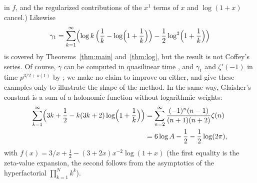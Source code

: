 \documentclass[11pt,reqno]{amsart}
\theoremstyle{definition}
\theoremstyle{remark}
\begin{document}
in $f$, and the regularized contributions of the $x^1$ terms of $x$ and $\log(1+x)$ cancel.) Likewise
\[
  \gamma_1 = \sum_{k=1}^{\infty}\Bigl(\log k\,\Bigl(\frac1k - \log\Bigl(1+\frac1k\Bigr)\Bigr)
    - \frac12\log^2\Bigl(1+\frac1k\Bigr)\Bigr)
\]
is covered by Theorems~\ref{thm:main} and~\ref{thm:log}, but the result is not Coffey's series. Of course, $\gamma$ can be computed in
quasilinear time \cite{BM80}, and $\gamma_1$ and $\zeta'(-1)$ in time $p^{3/2+o(1)}$ by \cite{Joh21}; we make no
claim to improve on either, and give these examples only to illustrate the shape of the method. In the same way,
Glaisher's constant is a sum of a holonomic
function without logarithmic weights:
\begin{align*}
  \sum_{k=1}^{\infty}\Bigl(3k + \frac12 - k(3k+2)\log\Bigl(1+\frac1k\Bigr)\Bigr)
  &= \sum_{n=2}^{\infty}\frac{(-1)^n(n-1)}{(n+1)(n+2)}\zeta(n) \\
  &= 6\log A - \frac12 - \frac12\log(2\pi),
\end{align*}
with $f(x) = 3/x + \frac12 - (3+2x)x^{-2}\log(1+x)$ (the first equality is the zeta-value expansion, the second
follows from the asymptotics of the hyperfactorial $\prod_{k=1}^{N}k^k$).
\end{document}
